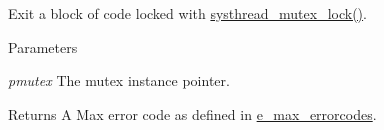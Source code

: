 Exit a block of code locked with \hyperlink{group__mutex_ga6a3bea4c2f5e5d133d25d78b51fb15bf}{systhread\_\-mutex\_\-lock()}. 
\begin{DoxyParams}{Parameters}
\item[{\em pmutex}]The mutex instance pointer. \end{DoxyParams}
\begin{DoxyReturn}{Returns}
A Max error code as defined in \hyperlink{group__misc_ga0764dd6c02b76cca7d053ae50555d69d}{e\_\-max\_\-errorcodes}. 
\end{DoxyReturn}

